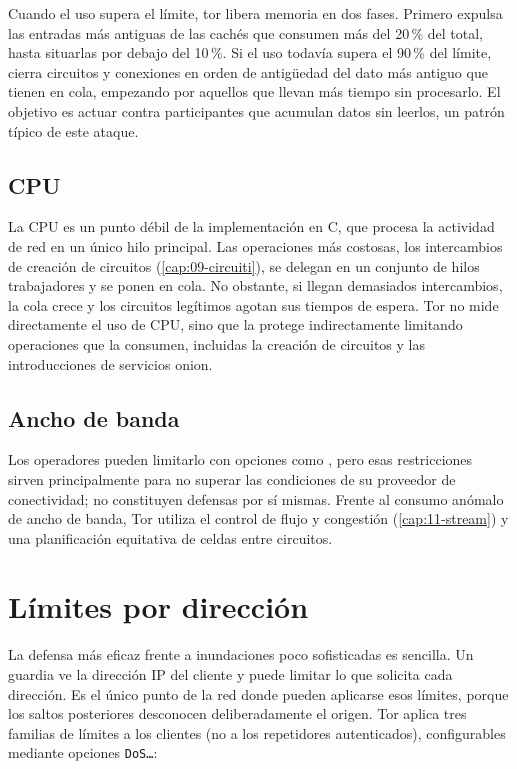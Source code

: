 Cuando el uso supera el límite, tor libera memoria en dos fases. Primero expulsa las entradas más antiguas de las cachés que consumen más del 20\,\% del total, hasta situarlas por debajo del 10\,\%. Si el uso todavía supera el 90\,\% del límite, cierra circuitos y conexiones en orden de antigüedad del dato más antiguo que tienen en cola, empezando por aquellos que llevan más tiempo sin procesarlo. El objetivo es actuar contra participantes que acumulan datos sin leerlos, un patrón típico de este ataque.

\subsection{CPU}

La CPU es un punto débil de la implementación en C, que procesa la actividad de red en un único hilo principal. Las operaciones más costosas, los intercambios de creación de circuitos (\cref{cap:09-circuiti}), se delegan en un conjunto de hilos trabajadores y se ponen en cola. No obstante, si llegan demasiados intercambios, la cola crece y los circuitos legítimos agotan sus tiempos de espera. Tor no mide directamente el uso de CPU, sino que la protege indirectamente limitando operaciones que la consumen, incluidas la creación de circuitos y las introducciones de servicios onion.

\subsection{Ancho de banda}

Los operadores pueden limitarlo con opciones como , pero esas restricciones sirven principalmente para no superar las condiciones de su proveedor de conectividad; no constituyen defensas por sí mismas. Frente al consumo anómalo de ancho de banda, Tor utiliza el control de flujo y congestión (\cref{cap:11-stream}) y una planificación equitativa de celdas entre circuitos.

\section{Límites por dirección}\label{sec:dos-limiti}

La defensa más eficaz frente a inundaciones poco sofisticadas es sencilla. Un guardia ve la dirección IP del cliente y puede limitar lo que solicita cada dirección. Es el único punto de la red donde pueden aplicarse esos límites, porque los saltos posteriores desconocen deliberadamente el origen. Tor aplica tres familias de límites a los clientes (no a los repetidores autenticados), configurables mediante opciones \texttt{DoS\ldots}:

